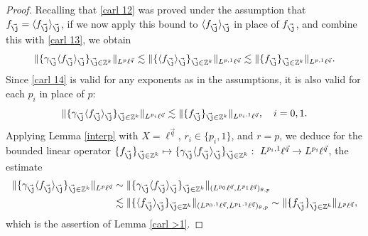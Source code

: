 \documentclass[10pt,a4paper]{amsart}
\newcommand{\Avee}[2]{\langle#1\rangle_{#2}}
\newcommand{\Norm}[2]{\|#1\|_{#2}}
\newcommand{\vj}{\vec{\textit{\j}}}
\newcommand{\vq}{\vec q}
\begin{document}
\begin{proof}
Recalling that \eqref{carl 12} was proved under the assumption that $f_{\vj}=\Avee{f_{\vj}}{\vj}$, if we now apply this bound to $\Avee{f_{\vj}}{\vj}$ in place of $f_{\vj}$, and combine this with \eqref{carl 13}, we obtain
\begin{equation}\label{carl 14}
\Norm{\{\gamma_{\vj}\Avee{f_{\vj}}{\vj}\}_{\vj\in\mathbb Z^k}}{L^p\ell^{\vq}}
\lesssim \Norm{\{\Avee{f_{\vj}}{\vj}\}_{\vj\in\mathbb Z^k}}{L^{p,1}\ell^{\vq}}
\lesssim \Norm{\{f_{\vj}\}_{\vj\in\mathbb Z^k}}{L^{p,1}\ell^{\vq}}.
\end{equation}
Since \eqref{carl 14} is valid for any exponents as in the assumptions, it is also valid for each $p_i$ in place of $p$:
\begin{equation*}
\Norm{\{\gamma_{\vj}\Avee{f_{\vj}}{\vj}\}_{\vj\in\mathbb Z^k}}{L^{p_i}\ell^{\vq}}
\lesssim \Norm{\{f_{\vj}\}_{\vj\in\mathbb Z^k}}{L^{p_i,1}\ell^{\vq}},\quad i=0,1.
\end{equation*}
Applying Lemma \ref{interp} with $X=\ell^{\vq}$, $r_i\in\{p_i,1\}$, and $r=p$, we deduce for the bounded linear operator $\{f_{\vj}\}_{\vj\in\mathbb Z^k}\mapsto\{\gamma_{\vj}\Avee{f_{\vj}}{\vj}\}_{\vj\in\mathbb Z^k}:\ L^{p_i,1}\ell^{\vq}\to L^{p_i}\ell^{\vq}$, the estimate
\begin{equation*}
\begin{split}
\Norm{\{\gamma_{\vj}\Avee{f_{\vj}}{\vj}\}_{\vj\in\mathbb Z^k}}{L^{p}\ell^{\vq}}
&\sim\Norm{\{\gamma_{\vj}\Avee{f_{\vj}}{\vj}\}_{\vj\in\mathbb Z^k}}{(L^{p_0}\ell^{\vq},L^{p_1}\ell^{\vq})_{\theta,p}} \\
&\lesssim\Norm{\{\Avee{f_{\vj}}{\vj}\}_{\vj\in\mathbb Z^k}}{(L^{p_0,1}\ell^{\vq},L^{p_1,1}\ell^{\vq})_{\theta,p}}
\sim \Norm{\{f_{\vj}\}_{\vj\in\mathbb Z^k}}{L^p\ell^{\vq}},
\end{split}
\end{equation*}
which is the assertion of Lemma \ref{carl >1}.
\end{proof}
\end{document}
